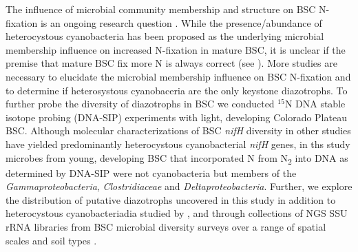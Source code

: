 The influence of microbial community membership and structure on BSC N-fixation
is an ongoing research question \cite{Belnap28062013}. While the
presence/abundance of heterocystous cyanobacteria has been proposed as the
underlying microbial membership influence on increased N-fixation in mature
BSC, it is unclear if the premise that mature BSC fix more N is always correct
(see \citet{15643930}). More studies are necessary to elucidate the microbial
membership influence on BSC N-fixation and to determine if heterosystous
cyanobaceria are the only keystone diazotrophs. To further probe the diversity
of diazotrophs in BSC we conducted $^{15}$N DNA stable isotope probing
(DNA-SIP) experiments with light, developing Colorado Plateau BSC. Although
molecular characterizations of BSC \textit{nifH} diversity in other studies
have yielded predominantly heterocystous cyanobacterial \textit{nifH} genes, in
ths study microbes from young, developing BSC that incorporated N from
N\textsubscript{2} into DNA as determined by DNA-SIP were not cyanobacteria but
members of the \textit{Gammaproteobacteria}, \textit{Clostridiaceae} and
\textit{Deltaproteobacteria}. Further, we explore the distribution of putative
diazotrophs uncovered in this study in addition to heterocystous
cyanobacteriadia studied by \citet{14766579}, \citet{Yeager} and
\citet{Yeager_2012} through collections of NGS SSU rRNA libraries from BSC
microbial diversity surveys over a range of spatial scales and soil types
\cite{Garcia_Pichel_2013, Steven_2013}.
